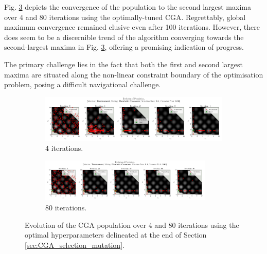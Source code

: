\documentclass[10pt]{article}
\begin{document}
\begin{multicols}{2}
Fig. \ref{fig:optimal_convergence} depicts the convergence of the population to the second largest maxima over 4 and 80 iterations using the optimally-tuned CGA. Regrettably, global maximum convergence remained elusive even after 100 iterations. However, there does seem to be a discernible trend of the algorithm converging towards the second-largest maxima in Fig. \ref{fig:optimal_convergence}, offering a promising indication of progress. 

The primary challenge lies in the fact that both the first and second largest maxima are situated along the non-linear constraint boundary of the optimisation problem, posing a difficult navigational challenge.

\end{multicols}
\begin{figure}[H]
    \centering
    \begin{subfigure}{0.9\textwidth}
        \centering
        \includegraphics[width=\textwidth]{../figures/Ungenerated Images/0.1_0.65_Population.png}
        \caption{4 iterations.}
        \label{fig:optimal_5}
    \end{subfigure}
    \begin{subfigure}{\textwidth}
        \centering
        \includegraphics[width=0.9\textwidth]{../figures/Ungenerated Images/0.1_0.65_Population100.png}
        \caption{80 iterations.}
        \label{fig:optimat_100}
    \end{subfigure}
    \captionsetup{justification=centering}
    \caption{Evolution of the CGA population over 4 and 80 iterations using the optimal hyperparameters delineated at the end of Section \ref{sec:CGA_selection_mutation}.}
    \label{fig:optimal_convergence}
\end{figure}
\newpage
\end{document}

